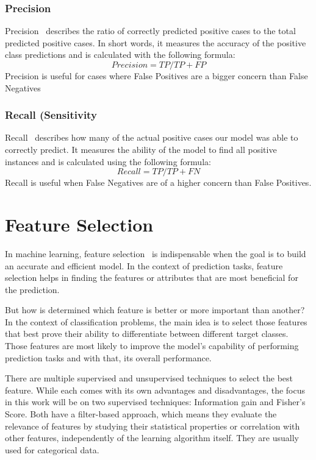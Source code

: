 \subsubsection{Precision}
Precision~\cite{evaluation_metrics} describes the ratio of correctly predicted positive cases to the total predicted positive cases. In short words, it measures the accuracy of the positive class predictions and is calculated with the following formula:
\[ Precision = {TP}/{TP + FP} \]
Precision is useful for cases where False Positives are a bigger concern than False Negatives

\subsubsection{Recall (Sensitivity}
Recall~\cite{evaluation_metrics} describes how many of the actual positive cases our model was able to correctly predict. It measures the ability of the model to find all positive instances and is calculated using the following formula:
\[ Recall = {TP}/{TP + FN} \]
Recall is useful when False Negatives are of a higher concern than False Positives.

\section{Feature Selection}
In machine learning, feature selection~\cite{feature_selection} is indispensable when the goal is to build an accurate and efficient model. In the context of prediction tasks, feature selection helps in finding the features or attributes that are most beneficial for the prediction. 

But how is determined which feature is better or more important than another? In the context of classification problems, the main idea is to select those features that best prove their ability to differentiate between different target classes. Those features are most likely to improve the model's capability of performing prediction tasks and with that, its overall performance.

There are multiple supervised and unsupervised techniques to select the best feature. While each comes with its own advantages and disadvantages, the focus in this work will be on two supervised techniques: Information gain and Fisher's Score. Both have a filter-based approach, which means they evaluate the relevance of features by studying their statistical properties or correlation with other features, independently of the learning algorithm itself. They are usually used for categorical data.

